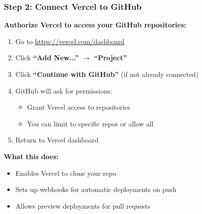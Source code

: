\begin{frame}[fragile]\frametitle{Step 2: Connect Vercel to GitHub}
\textbf{Authorize Vercel to access your GitHub repositories:}

  \begin{enumerate}
    \item Go to \url{https://vercel.com/dashboard}
    \item Click \textbf{``Add New...''} $\to$ \textbf{``Project''}
    \item Click \textbf{``Continue with GitHub''} (if not already connected)
    \item GitHub will ask for permissions:
      \begin{itemize}
        \item Grant Vercel access to repositories
        \item You can limit to specific repos or allow all
      \end{itemize}
    \item Return to Vercel dashboard
  \end{enumerate}

\textbf{What this does:}
  \begin{itemize}
    \item Enables Vercel to clone your repo
    \item Sets up webhooks for automatic deployments on push
    \item Allows preview deployments for pull requests
  \end{itemize}
\end{frame}


